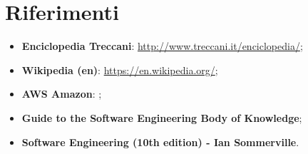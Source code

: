 \section{Riferimenti}

\begin{itemize}
\item \textbf{Enciclopedia Treccani}: \url{http://www.treccani.it/enciclopedia/};
\item \textbf{Wikipedia (en)}: \url{https://en.wikipedia.org/};
\item \textbf{AWS Amazon}: ;
\item \textbf{Guide to the Software Engineering Body of Knowledge};
\item \textbf{Software Engineering (10th edition) - Ian Sommerville}.
\end{itemize}

\clearpage